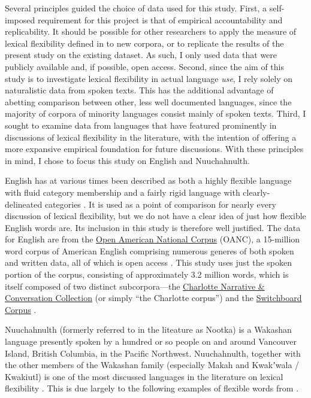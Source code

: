 Several principles guided the choice of data used for this study. First, a self-imposed requirement for this project is that of empirical accountability and replicability. It should be possible for other researchers to apply the measure of lexical flexibility defined in  to new corpora, or to replicate the results of the present study on the existing dataset. As such, I only used data that were publicly available and, if possible, open access. Second, since the aim of this study is to investigate lexical flexibility in actual language \emph{use}, I rely solely on naturalistic data from spoken texts. This has the additional advantage of abetting comparison between other, less well documented languages, since the majority of corpora of minority languages consist mainly of spoken texts. Third, I sought to examine data from languages that have featured prominently in discussions of lexical flexibility in the literature, with the intention of offering a more expansive empirical foundation for future discussions. With these principles in mind, I chose to focus this study on English and Nuuchahnulth.

English has at various times been described as both a highly flexible language with fluid category membership  and a fairly rigid language with clearly-delineated categories . It is used as a point of comparison for nearly every discussion of lexical flexibility, but we do not have a clear idea of just how flexible English words are. Its inclusion in this study is therefore well justified. The data for English are from the \href{http://www.anc.org/}{Open American National Corpus} (OANC), a 15-million word corpus of American English comprising numerous generes of both spoken and written data, all of which is open access . This study uses just the spoken portion of the corpus, consisting of approximately 3.2 million words, which is itself composed of two distinct subcorpora—the \href{https://newsouthvoices.uncc.edu}{Charlotte Narrative \& Conversation Collection} (or simply \enquote{the Charlotte corpus})  and the \href{https://catalog.ldc.upenn.edu/LDC97S62}{Switchboard Corpus} .

Nuuchahnulth (formerly referred to in the liteature as Nootka) is a Wakashan language presently spoken by a hundred or so people on and around Vancouver Island, British Columbia, in the Pacific Northwest. Nuuchahnulth, together with the other members of the Wakashan family (especially Makah and Kwakʼwala / Kwakiutl) is one of the most discussed languages in the literature on lexical flexibility . This is due largely to the following examples of flexible words from .

